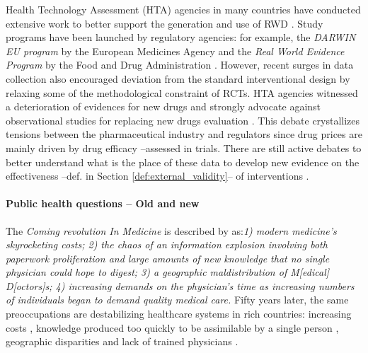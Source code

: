 \documentclass[french,12pt,twoside,a4paper]{book}
\def\sbc{\sffamily\fontseries{sbc}\selectfont}
\def\sbc{\fontseries{sbc}\selectfont}
\def\bsf#1{{\sffamily\sbc\fontsize{14}{11}\selectfont #1}}
\newcommand{\important}[1]{\textcolor{h_color}{\bsf{#1}}}
\begin{document}
Health Technology Assessment (HTA) agencies in many countries have conducted
extensive work to better support the generation and use of RWD
\citep{fda_real-world_2021,has_real-world_2021,kent_nice_2022,plamondongenevieve_integration_2022}.
Study programs have been launched by regulatory agencies: for example, the \emph{DARWIN EU program}
by the European Medicines Agency and the \emph{Real World Evidence Program} by the Food
and Drug Administration \citep{fda_real_2018}. However, recent surges in data
collection also encouraged deviation from the standard interventional design by
relaxing some of the methodological constraint of RCTs. HTA agencies witnessed a
deterioration of evidences for new drugs and strongly advocate against
observational studies for replacing new drugs evaluation
\citep{wieseler2023replacing,vanier2023rapid}. This debate crystallizes tensions
between the pharmaceutical industry and regulators since drug prices are
mainly driven by drug efficacy --assessed in trials.
%
There are still active debates to better understand what is the place of these
data to develop new evidence on the effectiveness --def. in Section
\ref{def:external_validity}-- of interventions \citep{richesson_electronic_2013,wang2023emulation}.


\paragraph{Public health questions -- Old and new}

The \emph{Coming revolution In Medicine} is described by
\cite{rutstein1967coming} as:\textit{1) modern medicine's skyrocketing costs; 2)
  the chaos of an information explosion involving both paperwork proliferation and
  large amounts of new knowledge that no single physician could hope to digest; 3)
  a geographic maldistribution of M[edical] D[octors]s; 4) increasing demands on
  the physician's time as increasing numbers of individuals began to demand
  quality medical care.} \important{Fifty years later, the same preoccupations are
  destabilizing healthcare systems in rich countries:} increasing costs
\citep{data_oecd_health_spending}, knowledge produced too quickly to be
assimilable by a single person \citep{mcginnis2013best}, geographic disparities
and lack of trained physicians \citep{anguis2021quelle,aamc2021}.
\end{document}
